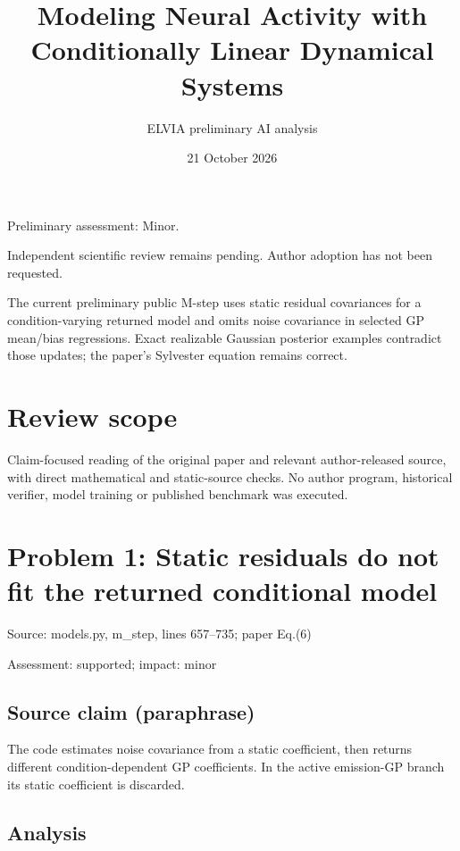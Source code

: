\documentclass[11pt]{article}
\begin{document}
\title{Modeling Neural Activity with Conditionally Linear Dynamical Systems}

\author{ELVIA preliminary AI analysis}\date{21 October 2026}\maketitle

Preliminary assessment: Minor.\par

Independent scientific review remains pending. Author adoption has not been requested.

The current preliminary public M-step uses static residual covariances for a condition-varying returned model and omits noise covariance in selected GP mean/bias regressions. Exact realizable Gaussian posterior examples contradict those updates; the paper’s Sylvester equation remains correct.

\section*{Review scope}

Claim-focused reading of the original paper and relevant author-released source, with direct mathematical and static-source checks. No author program, historical verifier, model training or published benchmark was executed.

\section*{Problem 1: Static residuals do not fit the returned conditional model}

Source: models.py, m\_step, lines 657–735; paper Eq.(6)

Assessment: supported; impact: minor

\subsection*{Source claim (paraphrase)}

The code estimates noise covariance from a static coefficient, then returns different condition-dependent GP coefficients. In the active emission-GP branch its static coefficient is discarded.

\subsection*{Analysis}
\end{document}
